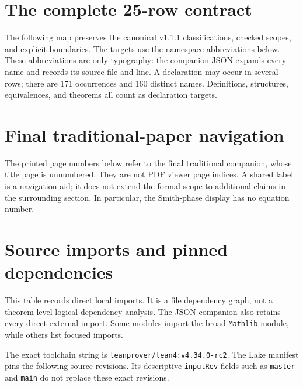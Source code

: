 \documentclass[11pt,a4paper]{article}
\newcommand{\code}[1]{\nolinkurl{#1}}
\begin{document}
\KomorebiCover
{}


\tableofcontents
\clearpage






\clearpage
\section{The complete 25-row contract}\label{sec:map}
The following map preserves the canonical v1.1.1 classifications, checked scopes, and explicit boundaries. The targets use the namespace abbreviations below. These abbreviations are only typography: the companion JSON expands every name and records its source file and line. A declaration may occur in several rows; there are 171 occurrences and 160 distinct names. Definitions, structures, equivalences, and theorems all count as declaration targets.


\clearpage
\appendix
\section{Final traditional-paper navigation}\label{app:crosswalk}
The printed page numbers below refer to the final traditional companion, whose title page is unnumbered. They are not PDF viewer page indices. A shared label is a navigation aid; it does not extend the formal scope to additional claims in the surrounding section. In particular, the Smith-phase display has no equation number.

\section{Source imports and pinned dependencies}\label{app:imports}
This table records direct local imports. It is a file dependency graph, not a theorem-level logical dependency analysis. The JSON companion also retains every direct external import. Some modules import the broad \code{Mathlib} module, while others list focused imports.

The exact toolchain string is \code{leanprover/lean4:v4.34.0-rc2}. The Lake manifest pins the following source revisions. Its descriptive \code{inputRev} fields such as \code{master} and \code{main} do not replace these exact revisions.

\end{document}
